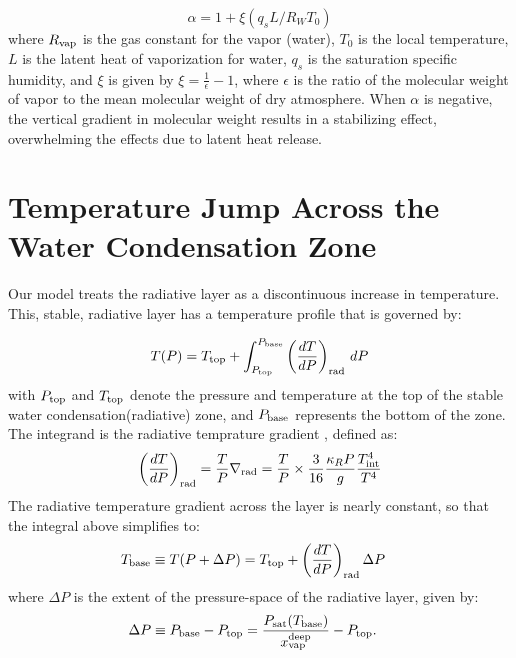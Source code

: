 \documentclass[11pt]{ucscthesisbs}
\begin{document}
\begin{equation}
  \alpha = 1 + \xi (q_{s} L / R_{W} T_{0}) 
  \label{eq:alpha}
\end{equation}
where $R_{\rm vap}$ is the gas constant for the vapor (water), $T_{0}$ is the local temperature, $L$ is the latent heat of vaporization for water, $q_{s}$ is the saturation specific humidity, and $\xi$ is given by $\xi = \frac{1}{\epsilon} - 1$, where $\epsilon$ is the ratio of the molecular weight of vapor to the mean molecular weight of dry atmosphere. When $\alpha$ is negative, the vertical gradient in molecular weight results in a stabilizing effect, overwhelming the effects due to latent heat release.

\section{Temperature Jump Across the Water Condensation Zone}
Our model treats the radiative layer as a discontinuous increase in temperature. This, stable, radiative layer has a temperature profile that is governed by:

\begin{equation}
  T(P) = T_{\rm top} + \int_{P_{\rm top}}^{P_{\rm base}} \left(\frac{dT}{dP}\right)_{\rm rad}\,d P
  \label{eq:temp_integral_over_radiative_layer}
\end{equation}
with $P_{\rm top}$ and $T_{\rm top}$ denote the pressure and temperature at the top of the stable water condensation(radiative) zone, and $P_{\rm base}$ represents the bottom of the zone. The integrand is the radiative temprature gradient \citep{leconte_2017}, defined as:
\begin{align}
  \left(\frac{dT}{dP}\right)_{\rm rad}=\frac{T}{P}\nabla_{\rm rad}
  = \frac{T}{P}\times\frac{3}{16}\frac{\kappa_R P}{g}\frac{T_{\rm int}^4}{T^4}
  \label{eq:radiative_gradient}
\end{align}
The radiative temperature gradient across the layer is nearly constant, so that the integral above simplifies to:
\begin{align}
T_{\rm base}\equiv T(P+\Delta P) &= T_{\rm top} + \left(\frac{dT}{dP}\right)_{\rm rad}\Delta P
\label{eq:temperature_profile_over_radiative_layer_simplification}
\end{align}
where $\Delta P$ is the extent of the pressure-space of the radiative layer, given by:
\begin{align}
\Delta P \equiv P_{\rm base}-P_{\rm top} &= \frac{P_{\rm sat}(T_{\rm base})}{x_{\rm vap}^{\rm deep}} - P_{\rm top}.
\label{eq:delta_P_over_radiative_layer}
\end{align}
\end{document}
